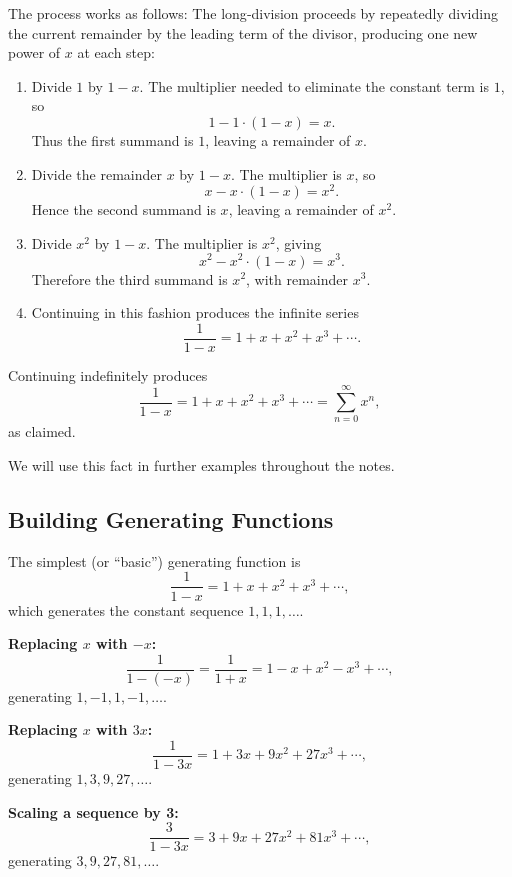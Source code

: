 \documentclass{article}
\begin{document}
The process works as follows:
The long‑division proceeds by repeatedly dividing the current remainder by the leading term of the divisor, producing one new power of \(x\) at each step:

\begin{enumerate}
  \item Divide \(1\) by \(1-x\). The multiplier needed to eliminate the constant term is \(1\), so 
  \[
    1 - 1\cdot(1-x) = x.
  \]
  Thus the first summand is \(1\), leaving a remainder of \(x\).

  \item Divide the remainder \(x\) by \(1-x\). The multiplier is \(x\), so
  \[
    x - x\cdot(1-x) = x^2.
  \]
  Hence the second summand is \(x\), leaving a remainder of \(x^2\).

  \item Divide \(x^2\) by \(1-x\). The multiplier is \(x^2\), giving
  \[
    x^2 - x^2\cdot(1-x) = x^3.
  \]
  Therefore the third summand is \(x^2\), with remainder \(x^3\).

  \item Continuing in this fashion produces the infinite series
  \[
    \frac{1}{1-x} = 1 + x + x^2 + x^3 + \cdots.
  \]
\end{enumerate}


Continuing indefinitely produces
\[
\frac{1}{1-x} = 1 + x + x^2 + x^3 + \cdots = \sum_{n=0}^\infty x^n,
\]
as claimed. \par
\noindent We will use this fact in further examples throughout the notes.

\subsection{Building Generating Functions}

The simplest (or “basic”) generating function is
\[
\frac{1}{1-x} = 1 + x + x^2 + x^3 + \cdots,
\]
which generates the constant sequence \(1,1,1,\dots\).

\medskip
\noindent
\textbf{Replacing \(x\) with \(-x\):}
\[
\frac{1}{1-(-x)} = \frac{1}{1+x} = 1 - x + x^2 - x^3 + \cdots,
\]
generating \(1,-1,1,-1,\dots\).

\medskip
\noindent
\textbf{Replacing \(x\) with \(3x\):}
\[
\frac{1}{1-3x} = 1 + 3x + 9x^2 + 27x^3 + \cdots,
\]
generating \(1,3,9,27,\dots\).

\medskip
\noindent
\textbf{Scaling a sequence by 3:}
\[
\frac{3}{1-3x} = 3 + 9x + 27x^2 + 81x^3 + \cdots,
\]
generating \(3,9,27,81,\dots\).
\end{document}
